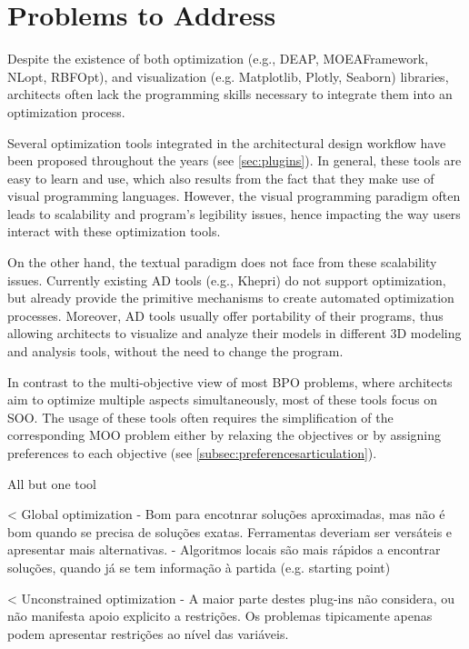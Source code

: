 \section{Problems to Address}

Despite the existence of both optimization  (e.g., DEAP, MOEAFramework, NLopt, RBFOpt), and visualization (e.g. Matplotlib, Plotly, Seaborn) libraries, architects often lack the programming skills necessary to integrate them into an optimization process. 

Several optimization tools integrated in the architectural design workflow have been proposed throughout the years (see \cref{sec:plugins}). In general, these tools are easy to learn and use, which also results from the fact that they make use of visual programming languages. However, the visual programming paradigm often leads to scalability and program's legibility issues, hence impacting the way users interact with these optimization tools. 

On the other hand, the textual paradigm does not face from these scalability issues. Currently existing \ac{AD} tools (e.g., Khepri) do not support optimization, but already provide the primitive mechanisms to create automated optimization processes. Moreover, \ac{AD} tools usually offer portability of their programs, thus allowing architects to visualize and analyze their models in different 3D modeling and analysis tools, without the need to change the program.

In contrast to the multi-objective view of most \ac{BPO} problems, where architects aim to optimize multiple aspects simultaneously, most of these tools focus on \ac{SOO}. The usage of these tools often requires the simplification of the corresponding \ac{MOO} problem either by relaxing the objectives or by assigning preferences to each objective (see \cref{subsec:preferencesarticulation}).

All but one tool

< Global optimization
- Bom para encotnrar soluções aproximadas, mas não é bom quando se precisa de soluções exatas. Ferramentas deveriam ser versáteis e apresentar mais alternativas. 
- Algoritmos locais são mais rápidos a encontrar soluções, quando já se tem informação à partida (e.g. starting point)

< Unconstrained optimization
- A maior parte destes plug-ins não considera, ou não manifesta apoio explicito a restrições. Os problemas tipicamente apenas podem apresentar restrições ao nível das variáveis. 

